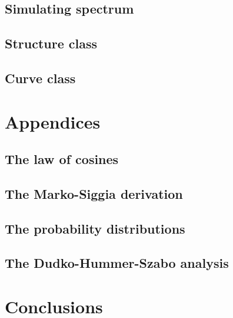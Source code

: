 \documentclass[11pt]{article}
\begin{document}
\subsection*{Simulating spectrum}
\label{subsec:code_simulating}

\subsection*{Structure class}
\label{subsec:code_structure}

\subsection*{Curve class}
\label{subsec:code_curve}

\section*{Appendices}
\label{sec:app}
\subsection*{The law of cosines}
\label{subsec:app_cosines}
\subsection*{The Marko-Siggia derivation}
\label{subsec:app_marko_siggia}
\subsection*{The probability distributions}
\label{subsec:app_probability}
\subsection*{The Dudko-Hummer-Szabo analysis}
\label{subsec:app_dudko}

\section{Conclusions}
\label{sec:conclusions}



\end{document}
